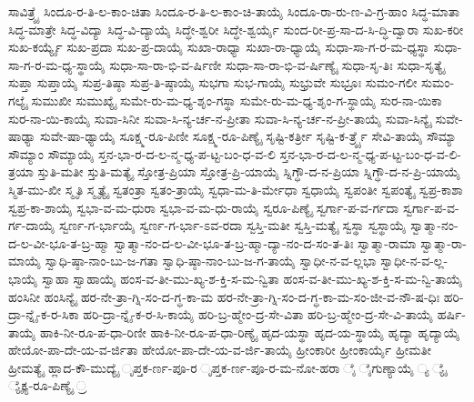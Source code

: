 {ಸಾವಿತ್ರ್ಯೈ
ಸಿಂದೂ-ರ-ತಿ-ಲ-ಕಾಂ-ಚಿತಾ
ಸಿಂದೂ-ರ-ತಿ-ಲ-ಕಾಂ-ಚಿ-ತಾಯೈ
ಸಿಂದೂ-ರಾ-ರು-ಣ-ವಿ-ಗ್ರ-ಹಾಂ
ಸಿದ್ಧ-ಮಾತಾ
ಸಿದ್ಧ-ಮಾತ್ರೇ
ಸಿದ್ಧ-ವಿದ್ಯಾ
ಸಿದ್ಧ-ವಿ-ದ್ಯಾಯೈ
ಸಿದ್ಧೇ-ಶ್ವರೀ
ಸಿದ್ಧೇ-ಶ್ವರ್ಯೈ
ಸುಂದ-ರೀ-ಪ್ರ-ಸಾ-ದ-ಸಿ-ದ್ಧಿ-ದ್ವಾರಾ
ಸುಖ-ಕರೀ
ಸುಖ-ಕರ್ಯ್ಯೈ
ಸುಖ-ಪ್ರದಾ
ಸುಖ-ಪ್ರ-ದಾಯೈ
ಸುಖಾ-ರಾಧ್ಯಾ
ಸುಖಾ-ರಾ-ಧ್ಯಾಯೈ
ಸುಧಾ-ಸಾ-ಗ-ರ-ಮ-ಧ್ಯಸ್ಥಾ
ಸುಧಾ-ಸಾ-ಗ-ರ-ಮ-ಧ್ಯ-ಸ್ಥಾಯೈ
ಸುಧಾ-ಸಾ-ರಾ-ಭಿ-ವ-ರ್ಷಿಣೀ
ಸುಧಾ-ಸಾ-ರಾ-ಭಿ-ವ-ರ್ಷಿಣ್ಯೈ
ಸುಧಾ-ಸೃ-ತಿಃ
ಸುಧಾ-ಸೃತ್ಯೈ
ಸುಪ್ತಾ
ಸುಪ್ತಾಯೈ
ಸುಪ್ರ-ತಿಷ್ಠಾ
ಸುಪ್ರ-ತಿ-ಷ್ಠಾಯೈ
ಸುಭಗಾ
ಸುಭ-ಗಾಯೈ
ಸುಭ್ರುವೇ
ಸುಭ್ರೂಃ
ಸುಮಂ-ಗಲೀ
ಸುಮಂ-ಗಲ್ಯೈ
ಸುಮುಖೀ
ಸುಮುಖ್ಯೈ
ಸುಮೇ-ರು-ಮ-ಧ್ಯ-ಶೃಂ-ಗಸ್ಥಾ
ಸುಮೇ-ರು-ಮ-ಧ್ಯ-ಶೃಂ-ಗ-ಸ್ಥಾಯೈ
ಸುರ-ನಾ-ಯಿಕಾ
ಸುರ-ನಾ-ಯಿ-ಕಾಯೈ
ಸುವಾ-ಸಿನೀ
ಸುವಾ-ಸಿ-ನ್ಯ-ರ್ಚ-ನ-ಪ್ರೀತಾ
ಸುವಾ-ಸಿ-ನ್ಯ-ರ್ಚ-ನ-ಪ್ರೀ-ತಾಯೈ
ಸುವಾ-ಸಿನ್ಯೈ
ಸುವೇ-ಷಾಢ್ಯಾ
ಸುವೇ-ಷಾ-ಢ್ಯಾಯೈ
ಸೂಕ್ಷ್ಮ-ರೂ-ಪಿಣೀ
ಸೂಕ್ಷ್ಮ-ರೂ-ಪಿಣ್ಯೈ
ಸೃಷ್ಟಿ-ಕರ್ತ್ರೀ
ಸೃಷ್ಟಿ-ಕ-ರ್ತ್ರ್ಯೈ
ಸೇವಿ-ತಾಯೈ
ಸೌಮ್ಯಾ
ಸೌಮ್ಯಾಂ
ಸೌಮ್ಯಾಯೈ
ಸ್ತನ-ಭಾ-ರ-ದ-ಲ-ನ್ಮ-ಧ್ಯ-ಪ-ಟ್ಟ-ಬಂ-ಧ-ವ-ಲಿ
ಸ್ತನ-ಭಾ-ರ-ದ-ಲ-ನ್ಮ-ಧ್ಯ-ಪ-ಟ್ಟ-ಬಂ-ಧ-ವ-ಲಿ-ತ್ರಯಾ
ಸ್ತುತಿ-ಮತೀ
ಸ್ತುತಿ-ಮತ್ಯೈ
ಸ್ತೋತ್ರ-ಪ್ರಿಯಾ
ಸ್ತೋತ್ರ-ಪ್ರಿ-ಯಾಯೈ
ಸ್ನಿಗ್ಧೌ-ದ-ನ-ಪ್ರಿಯಾ
ಸ್ನಿಗ್ಧೌ-ದ-ನ-ಪ್ರಿ-ಯಾಯೈ
ಸ್ಮಿತ-ಮು-ಖೀ
ಸ್ಮೃತಿ
ಸ್ಮೃತ್ಯೈ
ಸ್ವತಂತ್ರಾ
ಸ್ವತಂ-ತ್ರಾಯೈ
ಸ್ವಧಾ-ಮ-ತಿ-ರ್ಮೇಧಾ
ಸ್ವಧಾಯೈ
ಸ್ವಪಂತೀ
ಸ್ವಪಂತ್ಯೈ
ಸ್ವಪ್ರ-ಕಾಶಾ
ಸ್ವಪ್ರ-ಕಾ-ಶಾಯೈ
ಸ್ವಭಾ-ವ-ಮ-ಧುರಾ
ಸ್ವಭಾ-ವ-ಮ-ಧು-ರಾಯೈ
ಸ್ವರೂ-ಪಿಣ್ಯೈ
ಸ್ವರ್ಗಾ-ಪ-ವ-ರ್ಗದಾ
ಸ್ವರ್ಗಾ-ಪ-ವ-ರ್ಗ-ದಾಯೈ
ಸ್ವರ್ಣ-ಗ-ರ್ಭಾಯೈ
ಸ್ವರ್ಣ-ಗ-ರ್ಭಾ-ಽವ-ರದಾ
ಸ್ವಸ್ತಿ-ಮತೀ
ಸ್ವಸ್ತಿ-ಮತ್ಯೈ
ಸ್ವಸ್ಥಾ
ಸ್ವಸ್ಥಾಯೈ
ಸ್ವಾತ್ಮಾ-ನಂ-ದ-ಲ-ವೀ-ಭೂ-ತ-ಬ್ರ-ಹ್ಮಾ
ಸ್ವಾತ್ಮಾ-ನಂ-ದ-ಲ-ವೀ-ಭೂ-ತ-ಬ್ರ-ಹ್ಮಾ-ದ್ಯಾ-ನಂ-ದ-ಸಂ-ತ-ತಿಃ
ಸ್ವಾತ್ಮಾ-ರಾಮಾ
ಸ್ವಾತ್ಮಾ-ರಾ-ಮಾಯೈ
ಸ್ವಾಧಿ-ಷ್ಠಾ-ನಾಂ-ಬು-ಜ-ಗತಾ
ಸ್ವಾಧಿ-ಷ್ಠಾ-ನಾಂ-ಬು-ಜ-ಗ-ತಾಯೈ
ಸ್ವಾಧೀ-ನ-ವ-ಲ್ಲಭಾ
ಸ್ವಾಧೀ-ನ-ವ-ಲ್ಲ-ಭಾಯೈ
ಸ್ವಾಹಾ
ಸ್ವಾಹಾಯೈ
ಹಂಸ-ವ-ತೀ-ಮು-ಖ್ಯ-ಶ-ಕ್ತಿ-ಸ-ಮ-ನ್ವಿತಾ
ಹಂಸ-ವ-ತೀ-ಮು-ಖ್ಯ-ಶ-ಕ್ತಿ-ಸ-ಮ-ನ್ವಿ-ತಾಯೈ
ಹಂಸಿನೀ
ಹಂಸಿನ್ಯೈ
ಹರ-ನೇ-ತ್ರಾ-ಗ್ನಿ-ಸಂ-ದ-ಗ್ಧ-ಕಾ-ಮ
ಹರ-ನೇ-ತ್ರಾ-ಗ್ನಿ-ಸಂ-ದ-ಗ್ಧ-ಕಾ-ಮ-ಸಂ-ಜೀ-ವ-ನೌ-ಷ-ಧಿಃ
ಹರಿ-ದ್ರಾ-ನ್ನೈ-ಕ-ರ-ಸಿಕಾ
ಹರಿ-ದ್ರಾ-ನ್ನೈ-ಕ-ರ-ಸಿ-ಕಾಯೈ
ಹರಿ-ಬ್ರ-ಹ್ಮೇಂ-ದ್ರ-ಸೇ-ವಿತಾ
ಹರಿ-ಬ್ರ-ಹ್ಮೇಂ-ದ್ರ-ಸೇ-ವಿ-ತಾಯೈ
ಹರ್ಷಿ-ತಾಯೈ
ಹಾಕಿ-ನೀ-ರೂ-ಪ-ಧಾ-ರಿಣೀ
ಹಾಕಿ-ನೀ-ರೂ-ಪ-ಧಾ-ರಿಣ್ಯೈ
ಹೃದ-ಯಸ್ಥಾ
ಹೃದ-ಯ-ಸ್ಥಾಯೈ
ಹೃದ್ಯಾ
ಹೃದ್ಯಾಯೈ
ಹೇಯೋ-ಪಾ-ದೇ-ಯ-ವ-ರ್ಜಿತಾ
ಹೇಯೋ-ಪಾ-ದೇ-ಯ-ವ-ರ್ಜಿ-ತಾಯೈ
ಹ್ರೀಂಕಾರೀ
ಹ್ರೀಂಕಾರ್ಯೈ
ಹ್ರೀಮತೀ
ಹ್ರೀಮತ್ಯೈ
ಹ್ಲಾದ-ಕೌ-ಮುದ್ಯೈ
ೃಪ್ತಕ-ರ್ಣ-ಪೂ-ರ
ೃಪ್ತಕ-ರ್ಣ-ಪೂ-ರ-ಮ-ನೋ-ಹರಾ
ೈ
ೈಗುಣ್ಯಾಯೈ
್ಯ
್ಯೈ
್ಯೈಕ್ಯ-ರೂ-ಪಿಣ್ಯೈ
್ರ
}
